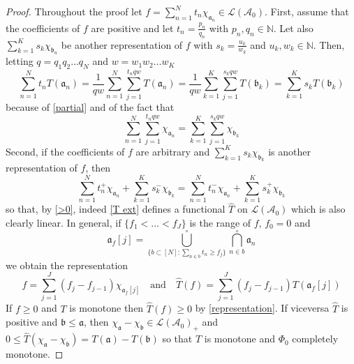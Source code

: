 \documentclass[11pt]{amsart}
\theoremstyle{plain}
\begin{document}
\begin{proof}
Throughout the proof let $f=\sum_{n=1}^Nt_n\chi_{{\mathfrak a}_n}\in{\mathscr L({\mathscr{A}}_0)}$. First, assume
that the coefficients of $f$ are positive and let $t_n=\frac{p_n}{q_n}$ with $p_n,q_n\in{\mathbb{N}}$.
Let also $\sum_{k=1}^Ks_k\chi_{{\mathfrak b}_n}$ be another representation of $f$ with
$s_k=\frac{u_k}{w_k}$ and $u_k,w_k\in{\mathbb{N}}$. Then, letting $q=q_1q_2\ldots q_N$ and 
$w=w_1w_2\ldots w_K$
\begin{equation}
\label{>0}
\sum_{n=1}^Nt_nT({\mathfrak a}_n)
=
\frac{1}{qw}\sum_{n=1}^N\sum_{j=1}^{t_nqw}T({\mathfrak a}_n)
=
\frac{1}{qw}\sum_{k=1}^K\sum_{j=1}^{s_kqw}T({\mathfrak b}_k)
=
\sum_{k=1}^Ks_kT({\mathfrak b}_k)
\end{equation}
because of \eqref{partial} and of the fact that
\begin{equation*}
\sum_{n=1}^N\sum_{j=1}^{t_nqw}\chi_{{\mathfrak a}_n}
=
\sum_{k=1}^K\sum_{j=1}^{s_kqw}\chi_{{\mathfrak b}_k}
\end{equation*}
Second, if the coefficients of $f$ are arbitrary and  $\sum_{k=1}^Ks_k\chi_{{\mathfrak b}_k}$ is 
another representation of $f$, then
\begin{equation*}
\sum_{n=1}^Nt^+_n\chi_{{\mathfrak a}_n}+\sum_{k=1}^Ks^-_k\chi_{{\mathfrak b}_k}
=
\sum_{n=1}^Nt^-_n\chi_{{\mathfrak a}_n}+\sum_{k=1}^Ks^+_k\chi_{{\mathfrak b}_k}
\end{equation*}
so that, by \eqref{>0}, indeed \eqref{T ext} defines a functional $\hat T$ on ${\mathscr L({\mathscr{A}}_0)}$ 
which is also clearly linear. In general, if $\{f_1<\ldots<f_J\}$ is the range of $f$,
$f_0=0$ and
\begin{equation*}
{\mathfrak a}_f[j]
=
\underset{\{b\subset[N]:\sum_{n\in b}t_n\ge f_j\}}{\overset\circ\bigcup}\underset{n\in b}{\overset\circ\bigcap}{\mathfrak a}_n
\end{equation*}
we obtain the representation 
\begin{equation}
\label{representation}
f=\sum_{j=1}^J(f_j-f_{j-1})\chi_{{\mathfrak a}_f[j]}
\quad\text{and}\quad
\hat T(f)=\sum_{j=1}^J(f_j-f_{j-1})T({\mathfrak a}_f[j])
\end{equation}
If $f\ge0$ and $T$ is monotone then $\hat T(f)\ge0$ by \eqref{representation}. If
viceversa $\hat T$ is positive and ${\mathfrak b}\le{\mathfrak a}$, then $\chi_{\mathfrak a}-\chi_{\mathfrak b}\in{\mathscr L({\mathscr{A}}_0)}_+$ and 
$0\le\hat T(\chi_{\mathfrak a}-\chi_{\mathfrak b})=T({\mathfrak a})-T({\mathfrak b})$ so that $T$ is monotone and $\Phi_0$
completely monotone. 
\end{proof}
\end{document}
